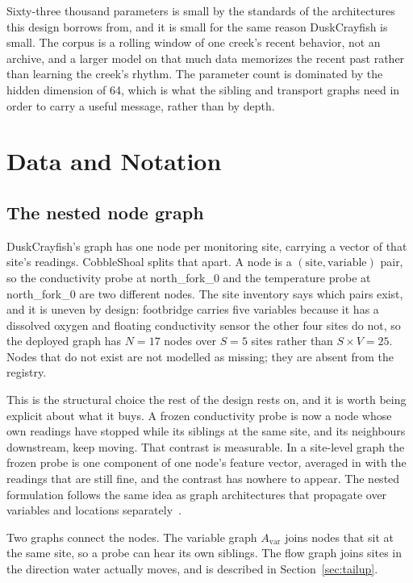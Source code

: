 \documentclass{article}
\begin{document}
Sixty-three thousand parameters is small by the standards of the architectures
this design borrows from, and it is small for the same reason DuskCrayfish is
small. The corpus is a rolling window of one creek's recent behavior, not an
archive, and a larger model on that much data memorizes the recent past rather
than learning the creek's rhythm. The parameter count is dominated by the
hidden dimension of 64, which is what the sibling and transport graphs need in
order to carry a useful message, rather than by depth.

\section{Data and Notation}
\label{sec:data}

\subsection{The nested node graph}
\label{sec:nested}

DuskCrayfish's graph has one node per monitoring site, carrying a vector of
that site's readings. CobbleShoal splits that apart. A node is a
$(\text{site}, \text{variable})$ pair, so the conductivity probe at
north\_fork\_0 and the temperature probe at north\_fork\_0 are two different
nodes. The site inventory says which pairs exist, and it is uneven by design:
footbridge carries five variables because it has a dissolved oxygen and
floating conductivity sensor the other four sites do not, so the deployed graph
has $N = 17$ nodes over $S = 5$ sites rather than $S \times V = 25$. Nodes that
do not exist are not modelled as missing; they are absent from the registry.

This is the structural choice the rest of the design rests on, and it is worth
being explicit about what it buys. A frozen conductivity probe is now a node
whose own readings have stopped while its siblings at the same site, and its
neighbours downstream, keep moving. That contrast is measurable. In a
site-level graph the frozen probe is one component of one node's feature
vector, averaged in with the readings that are still fine, and the contrast has
nowhere to appear. The nested formulation follows the same idea as graph
architectures that propagate over variables and locations
separately~\citep{defelice2024ggnet}.

Two graphs connect the nodes. The variable graph $A_{\mathrm{var}}$ joins nodes
that sit at the same site, so a probe can hear its own siblings. The flow graph
joins sites in the direction water actually moves, and is described in
Section~\ref{sec:tailup}.
\end{document}
